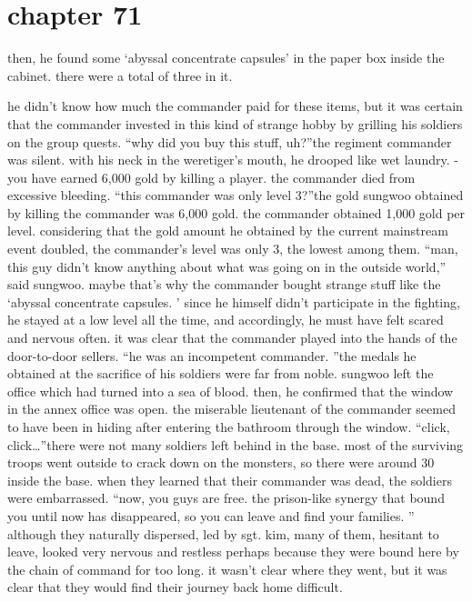 \section{chapter 71}

                            then, he found some ‘abyssal concentrate capsules’ in the paper box inside the cabinet.
 there were a total of three in it.





he didn’t know how much the commander paid for these items, but it was certain that the commander invested in this kind of strange hobby by grilling his soldiers on the group quests.
“why did you buy this stuff, uh?”the regiment commander was silent.
 with his neck in the weretiger’s mouth, he drooped like wet laundry.
-you have earned 6,000 gold by killing a player.
the commander died from excessive bleeding.
“this commander was only level 3?”the gold sungwoo obtained by killing the commander was 6,000 gold.
 the commander obtained 1,000 gold per level.
 considering that the gold amount he obtained by the current mainstream event doubled, the commander’s level was only 3, the lowest among them.
“man, this guy didn’t know anything about what was going on in the outside world,” said sungwoo.
maybe that’s why the commander bought strange stuff like the ‘abyssal concentrate capsules.
’ since he himself didn’t participate in the fighting, he stayed at a low level all the time, and accordingly, he must have felt scared and nervous often.
it was clear that the commander played into the hands of the door-to-door sellers.
“he was an incompetent commander.
”the medals he obtained at the sacrifice of his soldiers were far from noble.
sungwoo left the office which had turned into a sea of blood.
 then, he confirmed that the window in the annex office was open.
 the miserable lieutenant of the commander seemed to have been in hiding after entering the bathroom through the window.
“click, click…”there were not many soldiers left behind in the base.
 most of the surviving troops went outside to crack down on the monsters, so there were around 30 inside the base.
when they learned that their commander was dead, the soldiers were embarrassed.
“now, you guys are free.
 the prison-like synergy that bound you until now has disappeared, so you can leave and find your families.
”
although they naturally dispersed, led by sgt.
 kim, many of them, hesitant to leave, looked very nervous and restless perhaps because they were bound here by the chain of command for too long.
 it wasn’t clear where they went, but it was clear that they would find their journey back home difficult.
